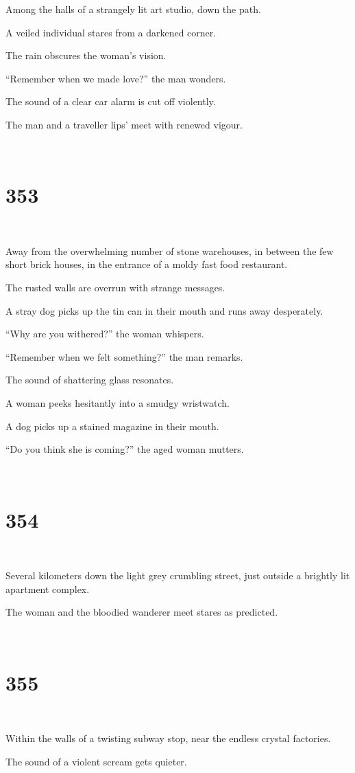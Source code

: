 \documentclass{report}
\begin{document}
Among the halls of a strangely lit art studio, down the path.

A veiled individual stares from a darkened corner.

The rain obscures the woman's vision.

``Remember when we made love?'' the man wonders.

The sound of a clear car alarm is cut off violently.

The man and a traveller lips' meet with renewed vigour.

~
\chapter*{353}
~

Away from the overwhelming number of stone warehouses, in between the few short brick houses, in the entrance of a moldy fast food restaurant.

The rusted walls are overrun with strange messages.

A stray dog picks up the tin can in their mouth and runs away desperately.

``Why are you withered?'' the woman whispers.

``Remember when we felt something?'' the man remarks.

The sound of shattering glass resonates.

A woman peeks hesitantly into a smudgy wristwatch.

A dog picks up a stained magazine in their mouth.

``Do you think she is coming?'' the aged woman mutters.

~
\chapter*{354}
~

Several kilometers down the light grey crumbling street, just outside a brightly lit apartment complex.

The woman and the bloodied wanderer meet stares as predicted.

~
\chapter*{355}
~

Within the walls of a twisting subway stop, near the endless crystal factories.

The sound of a violent scream gets quieter.
\end{document}

